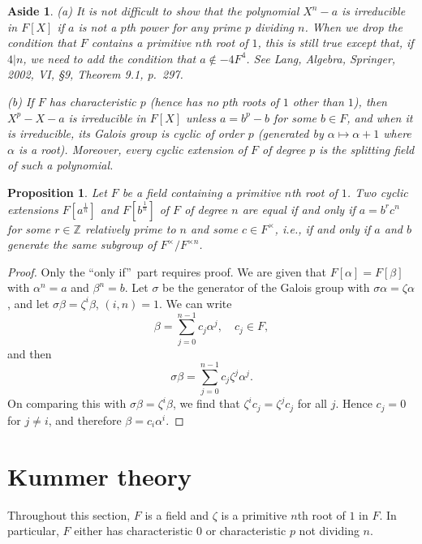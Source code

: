 \documentclass[a4paper,11pt,final,openany]{memoir}
\newtheorem{proposition}[X]{Proposition}
\newtheorem{aside}[X]{Aside}
\theoremstyle{nonumberplain}
\newtheorem{proof}{Proof.}
\begin{document}
\begin{aside}
\label{ag21}(a) It is not difficult to show that the polynomial $X^{n}-a$ is
irreducible in $F[X]$ if $a$ is not a $p$th power for any prime $p$ dividing
$n$. When we drop the condition that $F$ contains a primitive $n$th root of
$1$, this is still true except that, if $4|n$, we need to add the condition
that $a\notin-4F^{4}$. See Lang, Algebra, Springer, 2002, VI, \S 9, Theorem
9.1, p.~297.

(b) If $F$ has characteristic $p$ (hence has no $p$th roots of $1$ other than
$1$), then $X^{p}-X-a$ is irreducible in $F[X]$ unless $a=b^{p}-b$ for some
$b\in F$, and when it is irreducible, its Galois group is cyclic of order $p$
(generated by $\alpha\mapsto\alpha+1$ where $\alpha$ is a root). Moreover,
every cyclic extension of $F$ of degree $p$ is the splitting field of such a polynomial.
\end{aside}

\begin{proposition}
\label{ag20} Let $F$ be a field containing a primitive $n$th root of $1$. Two
cyclic extensions $F[a^{\frac{1}{n}}]$ and $F[b^{\frac{1}{n}}]$ of $F$ of
degree $n$ are equal if and only if $a=b^{r}c^{n}$ for some $r\in\mathbb{Z}$
relatively prime to $n$ and some $c\in F^{\times}$, i.e., if and only if $a$
and $b$ generate the same subgroup of $F^{\times}/F^{\times n}$.
\end{proposition}

\begin{proof}
Only the \textquotedblleft only if\textquotedblright\ part requires proof. We
are given that $F[\alpha]=F[\beta]$ with $\alpha^{n}=a$ and $\beta^{n}=b$. Let
$\sigma$ be the generator of the Galois group with $\sigma\alpha=\zeta\alpha$,
and let $\sigma\beta=\zeta^{i}\beta$, $(i,n)=1$. We can write
\[
\beta=\sum_{j=0}^{n-1}c_{j}\alpha^{j},\quad c_{j}\in F,
\]
and then
\[
\sigma\beta=\sum_{j=0}^{n-1}c_{j}\zeta^{j}\alpha^{j}.
\]
On comparing this with $\sigma\beta=\zeta^{i}\beta$, we find that $\zeta
^{i}c_{j}=\zeta^{j}c_{j}$ for all $j$. Hence $c_{j}=0$ for $j\neq i$, and
therefore $\beta=c_{i}\alpha^{i}$.
\end{proof}

\section{Kummer theory}

Throughout this section, $F$ is a field and $\zeta$ is a primitive $n$th root
of $1$ in $F$.\emph{\/} In particular, $F$ either has characteristic $0$ or
characteristic $p$ not dividing $n$.
\end{document}
